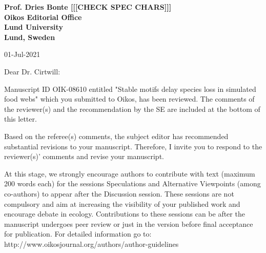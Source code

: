 \documentclass[12pt]{letter}
\begin{document}
\begin{letter}{\bf Prof. Dries Bonte [[[CHECK SPEC CHARS]]]\\
Oikos Editorial Office \\
Lund University \\
Lund, Sweden}




01-Jul-2021

Dear Dr. Cirtwill:

Manuscript ID OIK-08610 entitled "Stable motifs delay species loss in simulated food webs" which you submitted to Oikos, has been reviewed.  The comments of the reviewer(s) and the recommendation by the SE are included at the bottom of this letter.

Based on the referee(s) comments, the subject editor has recommended substantial revisions to your manuscript.  Therefore, I invite you to respond to the reviewer(s)' comments and revise your manuscript.

At this stage, we strongly encourage authors to contribute with text (maximum 200 words each) for the sessions Speculations and Alternative Viewpoints (among co-authors) to appear after the Discussion session.  These sessions are not compulsory and aim at increasing the visibility of your published work and encourage debate in ecology. Contributions to these sessions can be after the manuscript undergoes peer review or just in the version before final acceptance for publication.   For detailed information go to: http://www.oikosjournal.org/authors/author-guidelines


\end{letter}
\end{document}
